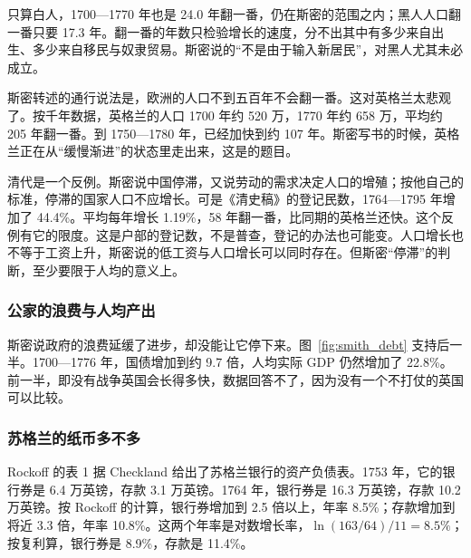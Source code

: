 只算白人，1700—1770 年也是 24.0 年翻一番，仍在斯密的范围之内；黑人人口翻一番只要 17.3 年。翻一番的年数只检验增长的速度，分不出其中有多少来自出生、多少来自移民与奴隶贸易。斯密说的“不是由于输入新居民”，对黑人尤其未必成立。

斯密转述的通行说法是，欧洲的人口不到五百年不会翻一番。这对英格兰太悲观了。按千年数据，英格兰的人口 1700 年约 520 万，1770 年约 658 万，平均约 205 年翻一番。到 1750—1780 年，已经加快到约 107 年\cite{boe2017,broadberry2015}。斯密写书的时候，英格兰正在从“缓慢渐进”的状态里走出来，这是的题目。


清代是一个反例。斯密说中国停滞，又说劳动的需求决定人口的增殖；按他自己的标准，停滞的国家人口不应增长。可是《清史稿》的登记民数，1764—1795 年增加了 44.4\%。平均每年增长 1.19\%，58 年翻一番，比同期的英格兰还快\cite{qingshigao}。这个反例有它的限度。这是户部的登记数，不是普查，登记的办法也可能变。人口增长也不等于工资上升，斯密说的低工资与人口增长可以同时存在。但斯密“停滞”的判断，至少要限于人均的意义上。

\subsubsection{公家的浪费与人均产出}
斯密说政府的浪费延缓了进步，却没能让它停下来。图~\ref{fig:smith_debt} 支持后一半。1700—1776 年，国债增加到约 9.7 倍，人均实际 GDP 仍然增加了 22.8\%\cite{boe2017}。前一半，即没有战争英国会长得多快，数据回答不了，因为没有一个不打仗的英国可以比较。

\subsubsection{苏格兰的纸币多不多}
Rockoff 的表 1 据 Checkland 给出了苏格兰银行的资产负债表\cite{rockoff2009}。1753 年，它的银行券是 6.4 万英镑，存款 3.1 万英镑。1764 年，银行券是 16.3 万英镑，存款 10.2 万英镑。按 Rockoff 的计算，银行券增加到 2.5 倍以上，年率 8.5\%；存款增加到将近 3.3 倍，年率 10.8\%\cite{rockoff2009}。这两个年率是对数增长率，$\ln(163/64)/11=8.5\%$；按复利算，银行券是 8.9\%，存款是 11.4\%。

